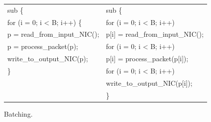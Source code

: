 \begin{figure}[ht]
\begin{small}
\begin{tabular}[b]{l|l}
sub\hspace{0.2cm}{\bf app} \{ &  sub\hspace{0.2cm}{\bf app} \{\\
\hspace{0.3cm}for (i = 0; i < B; i++) \{ &\hspace{0.3cm}for (i = 0; i < B; i++)\\
\hspace{0.6cm}p = read\_from\_input\_NIC(); &\hspace{0.6cm}p[i] = read\_from\_input\_NIC();\\
\hspace{0.6cm}p = process\_packet(p); & \hspace{0.3cm}for (i = 0; i < B; i++)\\
\hspace{0.6cm}write\_to\_output\_NIC(p); & \hspace{0.6cm}p[i] = process\_packet(p[i]);\\
\hspace{0.3cm}\} &\hspace{0.3cm}for (i = 0; i < B; i++)\\
&\hspace{0.6cm}write\_to\_output\_NIC(p[i]);\\
&\}\\
\end{tabular}
\end{small}
\caption{\label{fig:loop_fission_batch} Batching.}
\end{figure}

